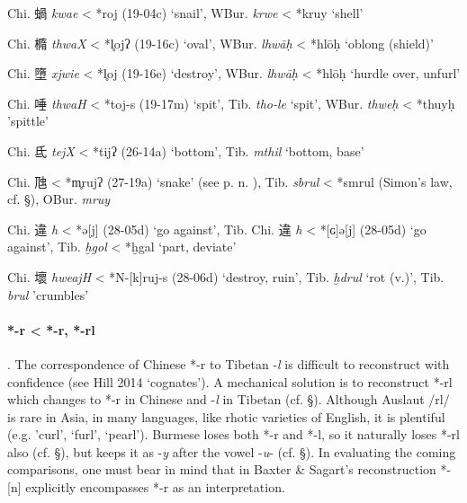 \begin{description}
\item
Chi. 蝸  \emph{kwae} \textless{} *{}roj (19-04c) `snail', WBur. {} \emph{krwe} \textless{} *kruy `shell'

\item
Chi. 橢  \emph{thwaX} \textless{} *l̥{}ojʔ (19-16c) `oval', WBur. {} \emph{lhwāḥ} \textless{} *hlōḥ `oblong (shield)'

\item
Chi. 墮  \emph{xjwie} \textless{} *l̥oj (19-16e) `destroy', WBur. {} \emph{lhwāḥ} \textless{} *hlōḥ `hurdle over, unfurl'

\item
Chi. 唾  \emph{thwaH} \textless{} *t{}{}oj-s (19-17m) `spit', Tib. {} \emph{tho-le} `spit', WBur. {} \emph{thweḥ} \textless{} *thuyḥ
'spittle'

\item
Chi. 氐  \emph{tejX} \textless{} *t{}ijʔ (26-14a) `bottom', Tib. {} \emph{mthil} `bottom, base'

\item
Chi. 虺  \emph{{}} \textless{} *m̥rujʔ (27-19a) `snake' (see p. n. ),
Tib. {} \emph{sbrul} \textless{} *smrul (Simon's law, cf. §), OBur. {} \emph{mruy}

\item
Chi. 違 \emph{h{}} \textless{} *{}ə{[}j] (28-05d) `go
against', Tib. {\protect\hypertarget{anchor-60}{}{}} Chi. 違 \emph{h{}}
\textless{} *[ɢ]{}ə[j] (28-05d) `go against', Tib. {}
{\emph{ḫgol}} \textless{} *ḫg{}al `part, deviate'

\item
Chi. 壞 \emph{hweajH} \textless{} *N-{[}k]{}ruj-s (28-06d) `destroy,
ruin', Tib. {} \emph{ḫdrul} `rot (v.)', Tib. {}~ \emph{brul}
'crumbles'
\end{description}

\paragraph{*-r \textless{} *-r, *-rl}. The correspondence of
Chinese *-r to Tibetan -\emph{l} is difficult to reconstruct with
confidence (see Hill 2014 `cognates'). A mechanical solution is to
reconstruct *-rl which changes to *-r in Chinese and -\emph{l} in
Tibetan (cf. §). Although Auslaut /rl/ is rare in Asia, in many
languages, like rhotic varieties of English, it is plentiful (e.g.
'curl', `furl', `pearl'). Burmese loses both *-r and *-l, so it
naturally loses *-rl also (cf. §), but keeps it as -\emph{y} after the
vowel -\emph{u}- (cf. §). In evaluating the coming comparisons, one must
bear in mind that in Baxter \& Sagart's reconstruction *-[n]
explicitly encompasses *-r as an interpretation.

